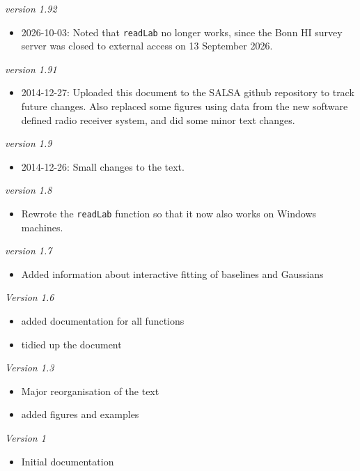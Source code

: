 \documentclass[11pt,a4paper]{article}
\begin{document}
\vspace{2ex}
\noindent 
\emph{version 1.92}
\begin{itemize}
\item 2026-10-03: Noted that \texttt{readLab} no longer works, since the
  Bonn HI survey server was closed to external access on 13 September 2026.
\end{itemize}
\vspace{2ex}
\noindent 
\emph{version 1.91}
\begin{itemize}
\item 2014-12-27: Uploaded this document to the SALSA github repository to
track future changes. Also replaced some figures using data from the new
software defined radio receiver system, and did some minor text changes.
\end{itemize}
\vspace{2ex}
\noindent 
\emph{version 1.9}
\begin{itemize}
\item 2014-12-26: Small changes to the text.
\end{itemize}
\vspace{2ex}
\noindent 
\emph{version 1.8}
\begin{itemize}
\item Rewrote the \texttt{readLab} function so that it now also works
  on Windows machines. 
\end{itemize}
\vspace{2ex}
\noindent
\emph{version 1.7}
\begin{itemize}
\item Added information about interactive fitting of baselines and
  Gaussians
\end{itemize}
\vspace{2ex}
\noindent
\emph{Version 1.6}
\begin{itemize}
\item added documentation for all functions
\item tidied up the document
\end{itemize}
\vspace{2ex}
\emph{Version 1.3}
\begin{itemize}
\item Major reorganisation of the text
\item added figures and examples
\end{itemize}
\vspace{2ex}
\noindent\emph{Version 1}
\begin{itemize}
\item Initial documentation
\end{itemize}
\vspace{2ex}
\end{document}
